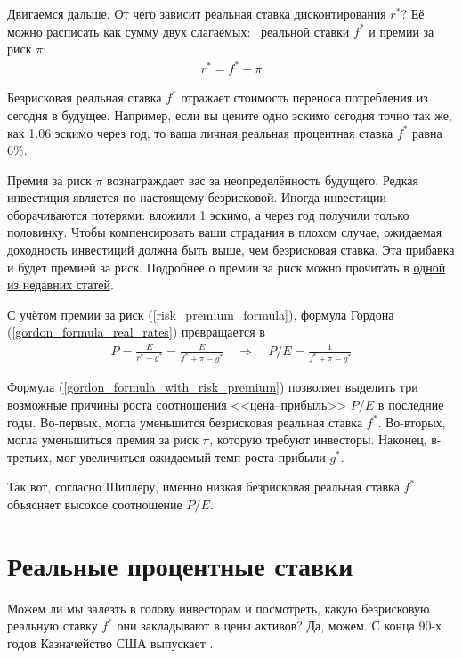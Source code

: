 Двигаемся дальше. От чего зависит реальная ставка дисконтирования $r^*$? Её можно расписать как сумму двух слагаемых: \ реальной ставки $f^*$ и премии за риск $\pi$:
\begin{align}
r^* = f^* + \pi
\label{risk_premium_formula}
\end{align}

Безрисковая реальная ставка $f^*$ отражает стоимость переноса потребления из сегодня в будущее. Например, если вы цените одно эскимо сегодня точно так же, как 1.06 эскимо через год, то ваша личная реальная процентная ставка $f^*$ равна $6\%$.

Премия за риск $\pi$ вознаграждает вас за неопределённость будущего. Редкая инвестиция является по-настоящему безрисковой. Иногда инвестиции оборачиваются потерями: вложили 1 эскимо, а через год получили только половинку. Чтобы компенсировать ваши страдания в плохом случае, ожидаемая доходность инвестиций должна быть выше, чем безрисковая ставка. Эта прибавка и будет премией за риск. Подробнее о премии за риск можно прочитать в \href{https://habr.com/ru/company/dbtc/blog/527050/}{одной из недавних статей}.

С учётом премии за риск (\ref{risk_premium_formula}), формула Гордона (\ref{gordon_formula_real_rates}) превращается в 
\begin{align}
P =\frac{E}{r^* - g^*} = \frac{E}{f^* + \pi - g^*}
\quad
\Rightarrow
\quad
P/E = \frac{1}{f^* + \pi - g^*}
\label{gordon_formula_with_risk_premium}
\end{align}

Формула (\ref{gordon_formula_with_risk_premium}) позволяет выделить три возможные причины роста соотношения <<цена--прибыль>> $P/E$ в последние годы. Во-первых, могла уменьшится безрисковая реальная ставка $f^*$. Во-вторых, могла уменьшиться премия за риск $\pi$, которую требуют инвесторы. Наконец, в-третьих, мог увеличиться ожидаемый темп роста прибыли $g^*$.

Так вот, согласно Шиллеру, именно низкая безрисковая реальная ставка $f^*$ объясняет высокое соотношение $P/E$.

\section*{Реальные процентные ставки}

Можем ли мы залезть в голову инвесторам и посмотреть, какую безрисковую реальную ставку $f^*$ они закладывают в цены активов? Да, можем. С конца 90-х годов Казначейство США выпускает .

